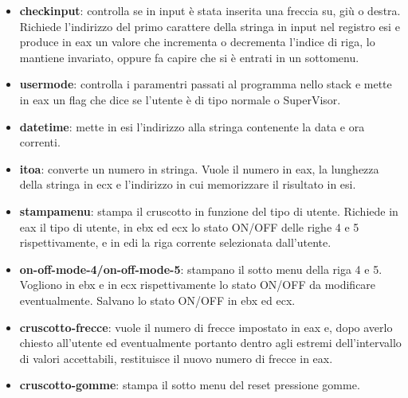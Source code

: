 \documentclass{article}
\begin{document}
\begin{itemize}
    \item \textbf{checkinput}: controlla se in input è stata inserita una freccia su, giù o destra. Richiede l'indirizzo del primo carattere della stringa in input nel registro esi e produce in eax un valore che incrementa o decrementa l'indice di riga, lo mantiene invariato, oppure fa capire che si è entrati in un sottomenu.
    \item \textbf{usermode}: controlla i paramentri passati al programma nello stack e mette in eax un flag che dice se l'utente è di tipo normale o SuperVisor.
    \item \textbf{datetime}: mette in esi l'indirizzo alla stringa contenente la data e ora correnti.
    \item \textbf{itoa}: converte un numero in stringa. Vuole il numero in eax, la lunghezza della stringa in ecx e l'indirizzo in cui memorizzare il risultato in esi.
    \item \textbf{stampamenu}: stampa il cruscotto in funzione del tipo di utente. Richiede in eax il tipo di utente, in ebx ed ecx lo stato ON/OFF delle righe 4 e 5 rispettivamente, e in edi la riga corrente selezionata dall'utente.
    \item \textbf{on-off-mode-4/on-off-mode-5}: stampano il sotto menu della riga 4 e 5. Vogliono in ebx e in ecx rispettivamente lo stato ON/OFF da modificare eventualmente. Salvano lo stato ON/OFF in ebx ed ecx.
    \item \textbf{cruscotto-frecce}: vuole il numero di frecce impostato in eax e, dopo averlo chiesto all'utente ed eventualmente portanto dentro agli estremi dell'intervallo di valori accettabili, restituisce il nuovo numero di frecce in eax.
    \item \textbf{cruscotto-gomme}: stampa il sotto menu del reset pressione gomme.
\end{itemize}
\end{document}
